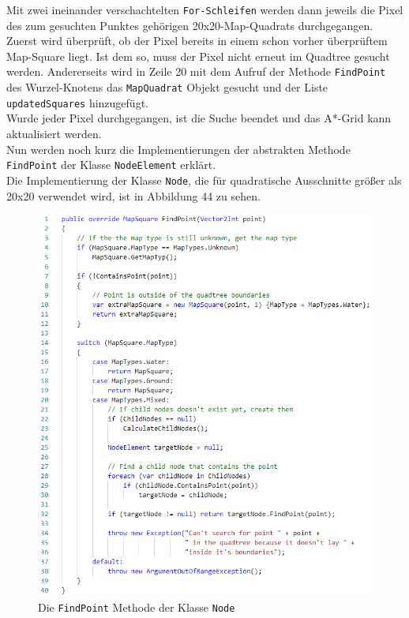 \documentclass[a4paper,12pt]{article}
\newcommand{\code}{\texttt}
\begin{document}
Mit zwei ineinander verschachtelten \code{For-Schleifen} werden dann jeweils die Pixel des zum gesuchten Punktes gehörigen 20x20-Map-Quadrats durchgegangen.
\\[0.4cm]
Zuerst wird überprüft, ob der Pixel bereits in einem schon vorher überprüftem Map-Square liegt. Ist dem so, muss der Pixel nicht erneut im Quadtree gesucht werden. Andererseits wird in Zeile 20 mit dem Aufruf der Methode \code{FindPoint} des Wurzel-Knotens das \code{MapQuadrat} Objekt gesucht und der Liste \code{updatedSquares} hinzugefügt.
\\[0.4cm]
Wurde jeder Pixel durchgegangen, ist die Suche beendet und das A*-Grid kann aktualisiert werden.
\\[0.4cm]
Nun werden noch kurz die Implementierungen der abstrakten Methode \code{FindPoint} der Klasse \code{NodeElement} erklärt.
\\[0.4cm]
Die Implementierung der Klasse \code{Node}, die für quadratische Ausschnitte größer als 20x20 verwendet wird, ist in Abbildung 44 zu sehen.
\begin{figure}[H]
    \centering
    \includegraphics[width=1\linewidth]{Bilder/Aufgabe3/Teilaufgabe_C/Quadtree_02.png}
    \caption{Die \code{FindPoint} Methode der Klasse \code{Node}}
\end{figure}
\end{document}
